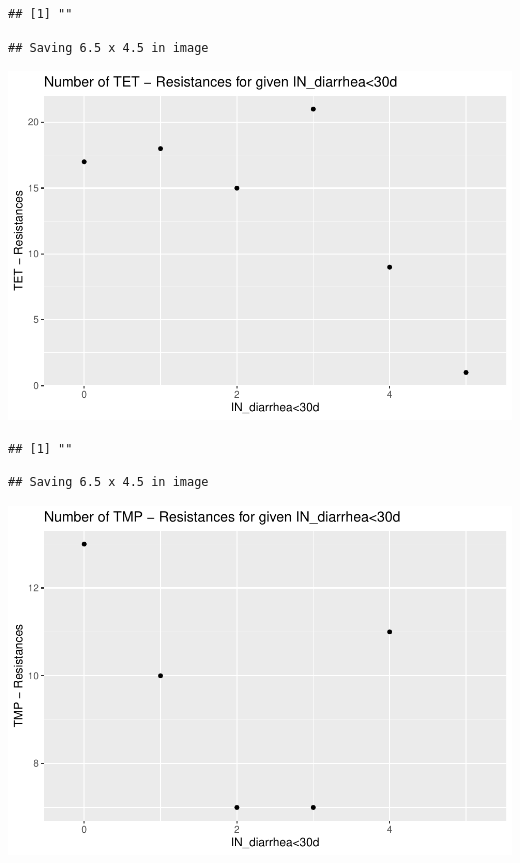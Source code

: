 \documentclass[
]{article}
\begin{document}
\begin{verbatim}
## [1] ""
\end{verbatim}

\begin{verbatim}
## Saving 6.5 x 4.5 in image
\end{verbatim}

\includegraphics{NResistenzen_files/figure-latex/numerical_variables-38.pdf}

\begin{verbatim}
## [1] ""
\end{verbatim}

\begin{verbatim}
## Saving 6.5 x 4.5 in image
\end{verbatim}

\includegraphics{NResistenzen_files/figure-latex/numerical_variables-39.pdf}
\end{document}
